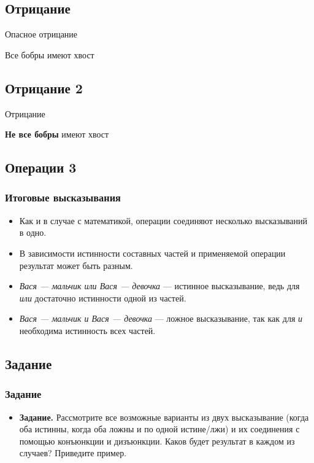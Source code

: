 \documentclass[compress,red]{beamer}
\begin{document}
\subsection{Отрицание}
\begin{frame}
  \begin{center}
    \Huge{Опасное отрицание}
  \end{center}
  \begin{center}
    \Large{Все бобры имеют хвост}
  \end{center}
\end{frame}

\subsection{Отрицание 2}
\begin{frame}
  \begin{center}
    \Huge{Отрицание}
  \end{center}
  \begin{center}
    \Large{\textbf{Не все бобры} имеют хвост}
  \end{center}
\end{frame}

\subsection{Операции 3}
\begin{frame}[fragile]
  \frametitle{Итоговые высказывания}
  \begin{itemize}
    \item Как и в случае с математикой, операции соединяют несколько высказываний в одно.
    \item В зависимости истинности составных частей и применяемой операции результат может быть разным.
    \item \emph{Вася --- мальчик или Вася --- девочка} --- истинное высказывание, ведь для \emph{или} достаточно истинности одной из частей.
    \item \emph{Вася --- мальчик и Вася --- девочка} --- ложное высказывание, так как для \emph{и} необходима истинность всех частей.
  \end{itemize}
\end{frame}

\subsection{Задание}
\begin{frame}[fragile]
  \frametitle{Задание}
  \begin{itemize}
    \item \textbf{Задание.} Рассмотрите все возможные варианты из двух высказывание (когда оба истинны, когда оба ложны и по одной истине/лжи) и их соединения с помощью конъюнкции и дизъюнкции. Каков будет результат в каждом из случаев? Приведите пример.
  \end{itemize}
\end{frame}
\end{document}
